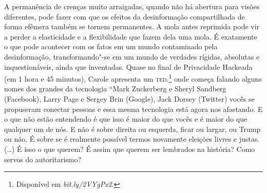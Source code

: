 A permanência de crenças muito arraigadas, quando não há abertura para
visões diferentes, pode fazer com que os efeitos da desinformação
compartilhada de forma efêmera também se tornem permanentes. A mola
antes reprimida pode vir a perder a elasticidade e a flexibilidade que
fazem dela uma mola. É exatamente o que pode acontecer com os fatos em
um mundo contaminado pela desinformação, transformando"-se em um mundo de
verdades rígidas, absolutas e inquestionáveis, ainda que inventadas.
Quase no final de Privacidade Hackeada (em 1 hora e 45 minutos), Carole
apresenta um \textsc{ted}.\footnote{Disponível em \textit{bit.ly/2VYgPx2}.} onde começa falando alguns nomes dos grandes
da tecnologia ``Mark Zuckerberg e Sheryl Sandberg (Facebook), Larry Page
e Sergey Brin (Google), Jack Dorsey (Twitter) vocês se propuseram
conectar pessoas e essa mesma tecnologia está agora nos afastando. E o
que não estão entendendo é que isso é maior do que vocês e é maior do
que qualquer um de nós. E não é sobre direita ou esquerda, ficar ou
largar, ou Trump ou não. É sobre se é realmente possível termos
novamente eleições livres e justas. (\ldots{}) É isso o que querem? É assim
que querem ser lembrados na história? Como servos do autoritarismo?

